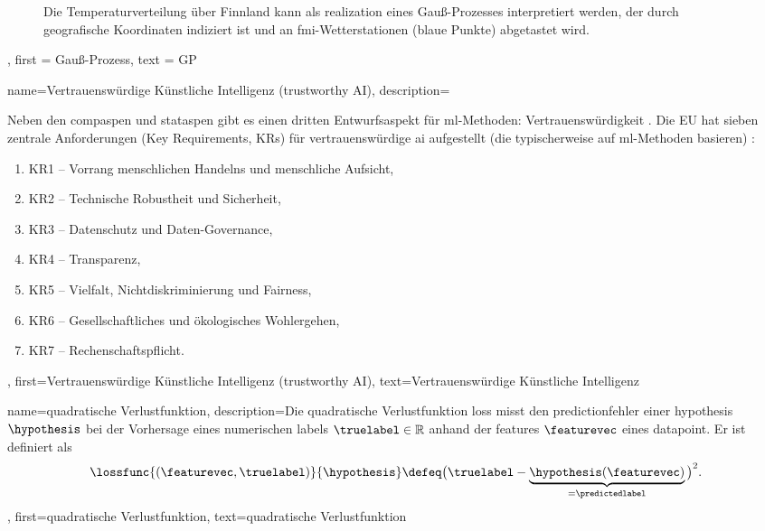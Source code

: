 {{{{\begin{figure}[H]
\begin{center}
				\vspace*{-15mm}
			\end{center}
			\caption{Die Temperaturverteilung über Finnland kann als \gls{realization} 
				eines Gauß-Prozesses interpretiert werden, der durch geografische Koordinaten indiziert ist und an \gls{fmi}-Wetterstationen (blaue Punkte) abgetastet wird. \label{fig_gp_FMI}}
	\end{figure}},
	first = {Gauß-Prozess},
	text = {GP}
}

	
{name={Vertrauenswürdige Künstliche Intelligenz (trustworthy AI)},
	description={Neben den \gls{compasp}en und \gls{statasp}en gibt es einen dritten 
		Entwurfsaspekt für \gls{ml}-Methoden: Vertrauenswürdigkeit 
		\cite{pfau2024engineeringtrustworthyaideveloper}. 
		Die EU hat sieben zentrale Anforderungen (Key Requirements, KRs) für 
		vertrauenswürdige \gls{ai} aufgestellt (die typischerweise auf \gls{ml}-Methoden basieren)
		\cite{ALTAIEU}:
		\begin{enumerate}[label=\arabic*)]
			\item KR1 – Vorrang menschlichen Handelns und menschliche Aufsicht,
			\item KR2 – Technische Robustheit und Sicherheit,
			\item KR3 – Datenschutz und Daten-Governance,
			\item KR4 – Transparenz,
			\item KR5 – Vielfalt, Nichtdiskriminierung und Fairness,
			\item KR6 – Gesellschaftliches und ökologisches Wohlergehen,
			\item KR7 – Rechenschaftspflicht.
		\end{enumerate}
	},
	first={Vertrauenswürdige Künstliche Intelligenz (trustworthy AI)},
	text={Vertrauenswürdige Künstliche Intelligenz}
}
	
{name={quadratische Verlustfunktion},
	description={Die quadratische Verlustfunktion  \gls{loss} 
		misst den \gls{prediction}fehler einer \gls{hypothesis} $\hypothesis$ 
		bei der Vorhersage eines numerischen \gls{label}s $\truelabel \in \mathbb{R}$ 
		anhand der \gls{feature}s $\featurevec$ eines \gls{datapoint}. Er ist definiert als
		\begin{equation} 
			\nonumber
			\lossfunc{(\featurevec,\truelabel)}{\hypothesis} \defeq \big(\truelabel - \underbrace{\hypothesis(\featurevec)}_{=\predictedlabel} \big)^{2}. 
		\end{equation}
	},
	first={quadratische Verlustfunktion},
	text={quadratische Verlustfunktion}
}


}}
